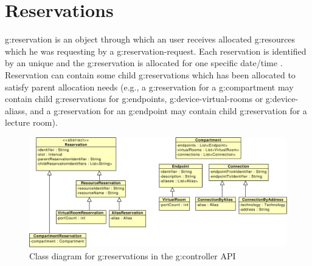 \section{Reservations}

\Gls{g:reservation} is an object through which an user receives allocated \glspl{g:resource} which he was requesting by a \gls{g:reservation-request}. Each reservation is identified by an unique  and the \gls{g:reservation} is allocated for one specific date/time . Reservation can contain some child \glspl{g:reservation} which has been allocated to satisfy parent allocation needs (e.g., a \gls{g:reservation} for a \gls{g:compartment} may contain child \glspl{g:reservation} for \glspl{g:endpoint}, \glspl{g:device-virtual-room} or \glspl{g:device-alias}, and a \gls{g:reservation} for an \gls{g:endpoint} may contain child \gls{g:reservation} for a lecture room).

\begin{figure}[ht!]
\includegraphics[width=\textwidth]{diagrams/cd_api_reservations}
\caption{Class diagram for \glspl{g:reservation} in the \gls{g:controller} API}
\label{fig:cd_api_reservations}
\end{figure}

